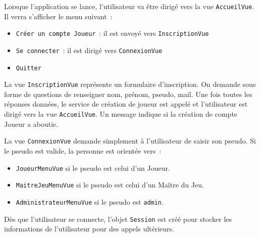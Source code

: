 \documentclass[11pt]{article}
\begin{document}
\bigbreak

Lorsque l'application se lance, l'utilisateur va être dirigé vers la vue \texttt{AccueilVue}. Il verra s'afficher le menu suivant~:
\begin{itemize}[label=, font=\small]
    \item \texttt{Créer un compte Joueur}~: il est envoyé vers \texttt{InscriptionVue}
    \item \texttt{Se connecter}~: il est dirigé vers \texttt{ConnexionVue}
    \item \texttt{Quitter}
\end{itemize}

\bigbreak

La vue \texttt{InscriptionVue} représente un formulaire d'inscription. On demande sous forme de questions de renseigner nom, prénom, pseudo, mail. Une fois toutes les réponses données, le service de création de joueur est appelé et l'utilisateur est dirigé vers la vue \texttt{AccueilVue}. Un message indique si la création de compte Joueur a aboutie. 

La vue \texttt{ConnexionVue} demande simplement à l'utilisateur de saisir son pseudo. Si le pseudo est valide, la personne est orientée vers~:
\begin{itemize}[label=, font=\small]
    \item \texttt{JoueurMenuVue} si le pseudo est celui d'un Joueur.
    \item \texttt{MaitreJeuMenuVue} si le pseudo est celui d'un Maître du Jeu.
    \item \texttt{AdministrateurMenuVue} si le pseudo est \texttt{admin}.
\end{itemize}

Dès que l'utilisateur se connecte, l'objet \texttt{Session} est créé pour stocker les informations de l'utilisateur pour des appels ultérieurs.
\bigbreak
\end{document}
